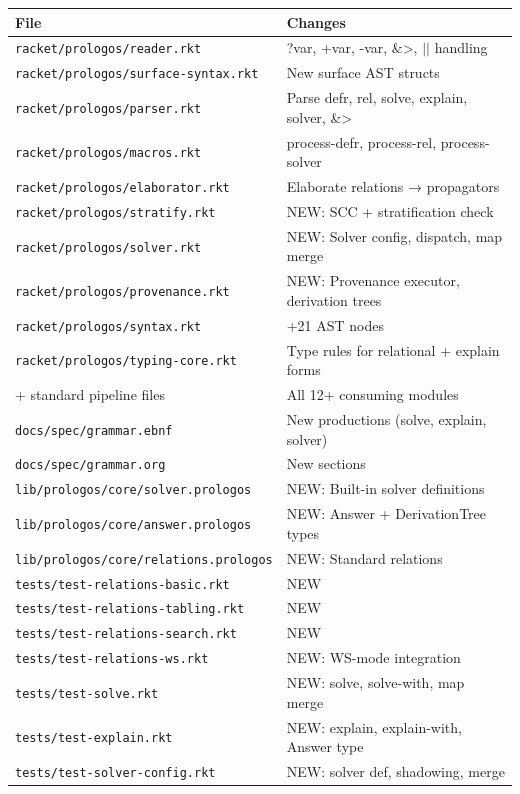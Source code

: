 \documentclass[11pt]{article}
\begin{document}
\begin{center}
\begin{tabular}{ll}
File & Changes\\
\hline
\texttt{racket/prologos/reader.rkt} & ?var, +var, -var, \&>, \(\vert{} \vert{}\) handling\\
\texttt{racket/prologos/surface-syntax.rkt} & New surface AST structs\\
\texttt{racket/prologos/parser.rkt} & Parse defr, rel, solve, explain, solver, \&>\\
\texttt{racket/prologos/macros.rkt} & process-defr, process-rel, process-solver\\
\texttt{racket/prologos/elaborator.rkt} & Elaborate relations → propagators\\
\texttt{racket/prologos/stratify.rkt} & NEW: SCC + stratification check\\
\texttt{racket/prologos/solver.rkt} & NEW: Solver config, dispatch, map merge\\
\texttt{racket/prologos/provenance.rkt} & NEW: Provenance executor, derivation trees\\
\texttt{racket/prologos/syntax.rkt} & +21 AST nodes\\
\texttt{racket/prologos/typing-core.rkt} & Type rules for relational + explain forms\\
+ standard pipeline files & All 12+ consuming modules\\
\texttt{docs/spec/grammar.ebnf} & New productions (solve, explain, solver)\\
\texttt{docs/spec/grammar.org} & New sections\\
\texttt{lib/prologos/core/solver.prologos} & NEW: Built-in solver definitions\\
\texttt{lib/prologos/core/answer.prologos} & NEW: Answer + DerivationTree types\\
\texttt{lib/prologos/core/relations.prologos} & NEW: Standard relations\\
\texttt{tests/test-relations-basic.rkt} & NEW\\
\texttt{tests/test-relations-tabling.rkt} & NEW\\
\texttt{tests/test-relations-search.rkt} & NEW\\
\texttt{tests/test-relations-ws.rkt} & NEW: WS-mode integration\\
\texttt{tests/test-solve.rkt} & NEW: solve, solve-with, map merge\\
\texttt{tests/test-explain.rkt} & NEW: explain, explain-with, Answer type\\
\texttt{tests/test-solver-config.rkt} & NEW: solver def, shadowing, merge\\
\end{tabular}
\end{center}
\end{document}
